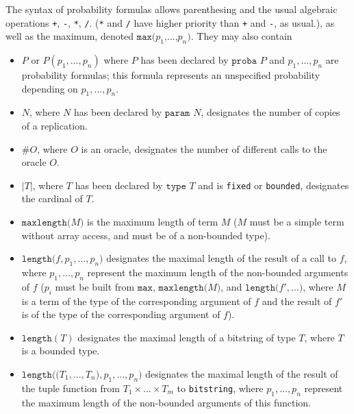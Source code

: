 The syntax of probability formulas allows parenthesing and the usual
algebraic operations \texttt{+}, \texttt{-}, \texttt{*}, \texttt{/}.
(\texttt{*} and \texttt{/} have higher priority than \texttt{+} and
\texttt{-}, as usual.), as well as the maximum, denoted 
$\texttt{max(}p_1\texttt{,}\ldots\texttt{,}p_n\texttt{)}$. 
They may also contain 
\begin{itemize}

\item $P$ or $P(p_1, \ldots,
p_n)$ where $P$ has been declared by $\texttt{proba }P$ and $p_1,
\ldots, p_n$ are probability formulas; this formula represents an
unspecified probability depending on $p_1, \ldots, p_n$. 

\item $N$, where $N$ has been declared by $\texttt{param }N$,
designates the number of copies of a replication.

\item $\#O$, where $O$ is an oracle,
designates the number of different calls to the oracle $O$. 

\item $|T|$, where
$T$ has been declared by $\texttt{type }T$ and is \texttt{fixed}
or \texttt{bounded}, designates the cardinal of $T$.

\item $\texttt{maxlength(}M\texttt{)}$ is the maximum
length of term $M$ ($M$ must be a simple term without array access, 
and must be of a non-bounded type).

\item $\texttt{length(}f, p_1, \ldots, p_n\texttt{)}$ designates the maximal
length of the result of a call to $f$, where $p_1, \ldots, p_n$
represent the maximum length of the non-bounded arguments of $f$
($p_i$ must be built from $\texttt{max}$,
$\texttt{maxlength(}M\texttt{)}$, and $\texttt{length(}f', \ldots
\texttt{)}$, where $M$ is a term of the type of the corresponding
argument of $f$ and the result of $f'$ is of the type of the
corresponding argument of $f$).

\item $\texttt{length}(T)$ designates the maximal 
length of a bitstring of type $T$, where $T$ is a bounded type.

\item $\texttt{length((}T_1, \ldots, T_n\texttt{)}, p_1, \ldots,
p_n\texttt{)}$ designates the maximal length of the result of the
tuple function from $T_1 \times \ldots \times T_m$ to
\texttt{bitstring}, where $p_1, \ldots, p_n$ represent the maximum
length of the non-bounded arguments of this function.


\end{itemize}
